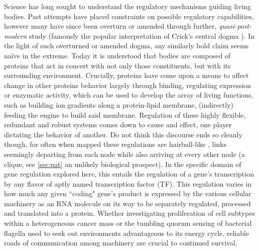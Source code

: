 Science has long sought to understand the regulatory mechanisms guiding living bodies. Past attempts have placed constraints on possible regulatory capabilities, however many have since been overturn or amended through further, \emph{quasi-post-modern} study (famously the popular interpretation of Crick's central dogma \citep{crick1958protein}). In the light of such overturned or amended dogma, any similarly bold claim seems na\"{i}ve in the extreme. Today it is understood that bodies are composed of proteins that act in concert with not only those constituents, but with its surrounding environment. Crucially, proteins have come upon a means to affect change in other proteins behavior largely through binding, \eg regulating expression or enzymatic activity, which can be used to develop the array of living functions, such as building ion gradients along a protein-lipid membrane, (indirectly) feeding the engine to build said membrane. Regulation of these highly flexible, redundant and robust systems comes down to cause and effect, \ie one player dictating the behavior of another. Do not think this discourse ends so cleanly though, for often when mapped these regulations are hairball-like \citep{schulz2013grooming}, links seemingly departing from each node while also arriving at every other node (\ie a clique, see \cref{sec:pat} an unlikely biological prospect). In the specific domain of gene regulation explored here, this entails the regulation of a gene's transcription by any flavor of aptly named transcription factor (TF). This regulation varies in how much any given ``coding" gene's product is expressed by the various cellular machinery as an RNA molecule on its way to be separately regulated, processed and translated into a protein. Whether investigating proliferation of cell subtypes within a heterogeneous cancer mass \citep{weinberg1996cancer} or the tumbling quorum sensing of bacterial flagella used to seek out environments advantageous to its energy cycle, reliable roads of communication among machinery are crucial to continued survival.


